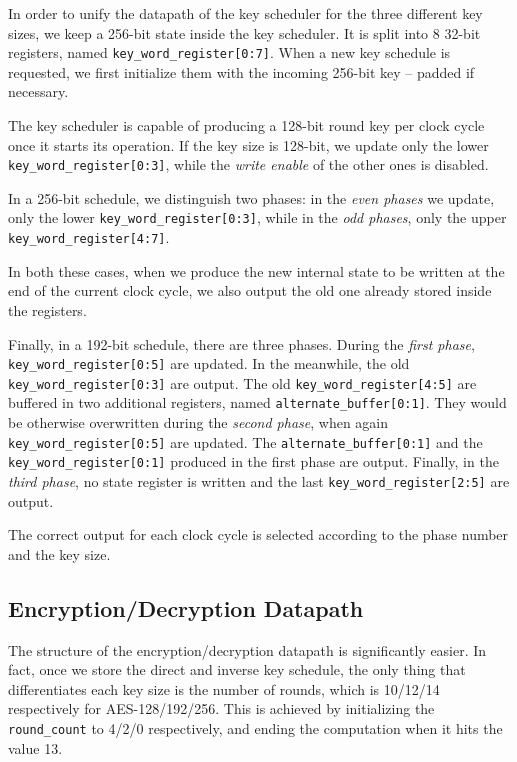 In order to unify the datapath of the key scheduler for the three different key sizes, we keep
a 256-bit state inside the key scheduler. It is split into 8 32-bit registers, named
\texttt{key\_word\_register[0:7]}.
When a new key schedule is requested, we first initialize them with the incoming 256-bit
key -- padded if necessary.

The key scheduler is capable of producing a 128-bit round key per clock cycle once it starts
its operation.
If the key size is 128-bit, we update only the lower \texttt{key\_word\_register[0:3]}, while
the \textit{write enable} of the other ones is disabled.

In a 256-bit schedule, we distinguish two phases: in the \textit{even phases} we update,
only the lower
\texttt{key\_word\_register[0:3]}, while in the \textit{odd phases}, only the upper
\texttt{key\_word\_register[4:7]}.

In both these cases, when we produce the new internal state to be written at the end of the
current clock cycle, we also output the old one already stored inside the registers.

Finally, in a 192-bit schedule, there are three phases.
During the \textit{first phase}, \texttt{key\_word\_register[0:5]} are updated. In the meanwhile,
the old \texttt{key\_word\_register[0:3]} are output. The old \texttt{key\_word\_register[4:5]}
are buffered in two additional registers, named \texttt{alternate\_buffer[0:1]}. They would be otherwise
overwritten
during the \textit{second phase}, when again \texttt{key\_word\_register[0:5]} are updated. The
\texttt{alternate\_buffer[0:1]} and the \texttt{key\_word\_register[0:1]} produced in the first
phase are output.
Finally, in the \textit{third phase}, no state register is written and the last
\texttt{key\_word\_register[2:5]} are output.

The correct output for each clock cycle is selected according to the phase number and the
key size.

\subsection{Encryption/Decryption Datapath}

The structure of the encryption/decryption datapath is significantly easier.
In fact, once we store the direct and inverse key schedule, the only thing
that differentiates each key size is the number of rounds, which is 10/12/14 respectively
for AES-128/192/256. This is achieved by initializing the \texttt{round\_count} to 4/2/0
respectively, and ending the computation when it hits the value 13.

